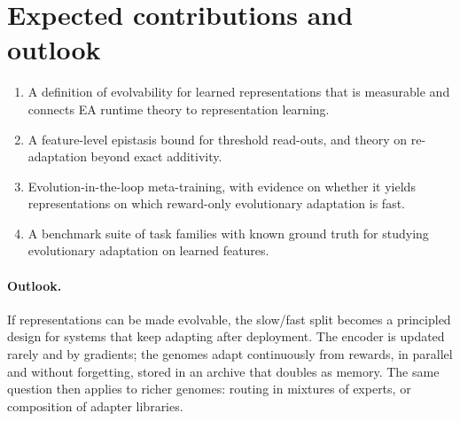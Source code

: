 \documentclass[11pt,a4paper]{article}
\theoremstyle{definition}
\theoremstyle{plain}
\theoremstyle{remark}
\begin{document}
\section{Expected contributions and outlook}
\begin{enumerate}
\item A definition of evolvability for learned representations that is measurable and connects EA runtime theory to representation learning.
\item A feature-level epistasis bound for threshold read-outs, and theory on re-adaptation beyond exact additivity.
\item Evolution-in-the-loop meta-training, with evidence on whether it yields representations on which reward-only evolutionary adaptation is fast.
\item A benchmark suite of task families with known ground truth for studying evolutionary adaptation on learned features.
\end{enumerate}

\paragraph{Outlook.}
If representations can be made evolvable, the slow/fast split becomes a principled design for systems that keep adapting after deployment. The encoder is updated rarely and by gradients; the genomes adapt continuously from rewards, in parallel and without forgetting, stored in an archive that doubles as memory. The same question then applies to richer genomes: routing in mixtures of experts, or composition of adapter libraries.
\end{document}
